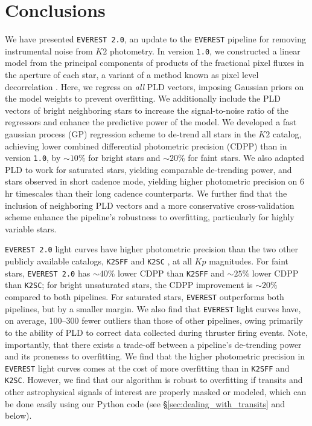 \documentclass[]{aastex62}
\newcommand{\Kp}{\ensuremath{Kp}}
\newcommand{\edited}[1]{{\color{red} #1}}
\begin{document}
\section{Conclusions}
\label{sec:conclusions}
We have presented \texttt{EVEREST 2.0}, an update to the \texttt{EVEREST} pipeline
\citep{Luger16} for removing instrumental noise from $K2$ photometry. In version
\texttt{1.0}, we constructed a linear model from the principal components of
products of the fractional pixel fluxes in the aperture of each star, a variant
of a method known as pixel level decorrelation \citep[PLD,][]{Deming15}. Here,
we regress on \emph{all} PLD vectors, imposing Gaussian priors on the model
weights to prevent overfitting. We additionally include the PLD vectors of bright
neighboring stars to increase the signal-to-noise ratio of the regressors and
enhance the predictive power of the model. We developed a fast gaussian process (GP)
regression scheme to de-trend all stars in the $K2$ catalog, achieving lower
combined differential photometric precision (CDPP) than in version \texttt{1.0},
by ${\sim}10\%$ for bright stars and ${\sim}20\%$ for faint stars. We also
adapted PLD to work for saturated stars, yielding comparable de-trending power,
and stars observed in short cadence mode, yielding higher photometric precision
on 6 hr timescales than their long cadence counterparts.
We further find that the inclusion of neighboring PLD vectors and a
more conservative cross-validation scheme enhance the pipeline's robustness
to overfitting, particularly for highly variable stars.

\texttt{EVEREST 2.0} light curves have higher photometric precision than the two
other publicly available catalogs, \texttt{K2SFF} \citep{VanderburgJohnson14}
and \texttt{K2SC} \citep{Aigrain16}, at all $\Kp$ magnitudes. For faint stars,
\texttt{EVEREST 2.0} has ${\sim}40\%$ lower CDPP than \texttt{K2SFF} and
${\sim}25\%$ lower CDPP than \texttt{K2SC}; for bright unsaturated stars, the CDPP
improvement is ${\sim}20\%$ compared to both pipelines. For saturated stars,
\texttt{EVEREST} outperforms both pipelines, but by a smaller margin. We also
find that \texttt{EVEREST} light curves have, on average, 100--300 fewer outliers
than those of other pipelines, owing primarily to the ability of PLD to correct
data collected during thruster firing events. \edited{Note, importantly, that there
exists a trade-off between a pipeline's de-trending power and its proneness
to overfitting. We find that the higher photometric precision in \texttt{EVEREST}
light curves comes at the cost of more overfitting than in \texttt{K2SFF} and
\texttt{K2SC}. However, we find that our algorithm is robust to overfitting
if transits and other astrophysical signals of interest
are properly masked or modeled, which can be done easily using our
Python code (see \S\ref{sec:dealing_with_transits} and below).}
\end{document}
